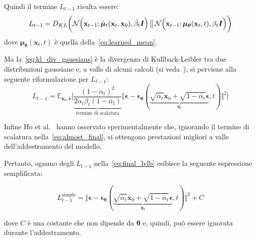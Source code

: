 \noindent Quindi il termine $L_{t-1}$ risulta essere:
\begin{equation}
L_{t-1}=D_{KL}\biggl(\mathcal{N}\Bigl(\mathbf{x}_{t-1}; \tilde{\bm{\mu}}_{t}(\mathbf{x}_t,\mathbf{x}_0),\tilde{\beta_t} \bm{I}\Bigr)\,\big\|\,\mathcal{N}\Bigl(\mathbf{x}_{t-1};\bm{\mu}_{\bm{\theta}}(\mathbf{x}_t,t),\beta_t\bm{I}\Bigr)\biggr)
\label{eq:kl_div_gaussians}
\end{equation}
dove $\bm{\mu}_{\bm{\theta}}(\mathbf{x}_t,t)$ è quella della~\eqref{eq:learned_mean}.

Ma la~\eqref{eq:kl_div_gaussians} è la divergenza di Kullback-Leibler tra due distribuzioni gaussiane e, a valle di alcuni calcoli (si veda~\cite{nain2022}), 
si perviene alla seguente riformulazione per $L_{t-1}$:
\begin{equation}
L_{t-1}=\mathbb{E}_{\mathbf{x}_0,\bm{\epsilon}}\biggl[\underbrace{\frac{(1-\alpha_t)^2}{2\alpha_t\beta_t(1-\overline{\alpha}_t)}}_{\text{termine di scalatura}}\Big\Vert \bm{\epsilon}-
\bm{\epsilon}_{\bm{\theta}}(\underbrace{\sqrt{\overline{\alpha}_t}\mathbf{x}_0+\sqrt{1-\overline{\alpha}_t}\bm{\epsilon}}_{\mathbf{x}_t},t)\Big\Vert^2\biggr] \label{eq:almost_final}
\end{equation}

\noindent Infine Ho et al.~\cite{ho2020} hanno osservato sperimentalmente che, ignorando il termine di scalatura nella~\eqref{eq:almost_final}, 
si ottengono prestazioni migliori a valle dell'addestramento del modello. 

Pertanto, ognuno degli $L_{t-1}$ nella~\eqref{eq:final_lvlb} esibisce la seguente espressione semplificata:
\begin{Mybox2}
\begin{equation}
    L_{t-1}^{\text{simple}}=\Vert \bm{\epsilon}-
    \bm{\epsilon}_{\bm{\theta}}(\underbrace{\sqrt{\overline{\alpha}_t}\mathbf{x}_0+\sqrt{1-\overline{\alpha}_t}\bm{\epsilon}}_{\mathbf{x}_t},t)\Vert^2 +C
\end{equation}
\end{Mybox2}

\smallskip
\noindent dove $C$ è una costante che non dipende da $\bm{\theta}$ e, quindi, può essere ignorata durante l'addestramento.